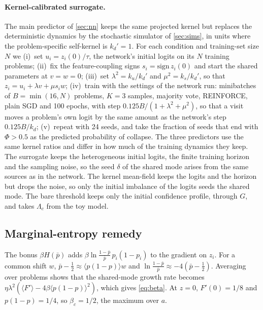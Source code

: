 \paragraph{Kernel-calibrated surrogate.}
The main predictor of \cref{sec:nn} keeps the same projected kernel but replaces the deterministic dynamics by the stochastic simulator of \cref{sec:sims}, in units where the problem-specific self-kernel is $k_d'=1$.
For each condition and training-set size $N$ we
(i)~set $u_i=z_i(0)/\tau$, the network's initial logits on its $N$ training problems;
(ii)~fix the feature-coupling signs $s_i=\mathrm{sign}\,z_i(0)$ and start the shared parameters at $v=w=0$;
(iii)~set $\lambda^2=k_u/k_d'$ and $\mu^2=k_s/k_d'$, so that $z_i=u_i+\lambda v+\mu s_iw$;
(iv)~train with the settings of the network run: minibatches of $B=\min(16,N)$ problems, $K=3$ samples, majority vote, REINFORCE, plain SGD and 100 epochs, with step $0.125B/(1+\lambda^2+\mu^2)$, so that a visit moves a problem's own logit by the same amount as the network's step $0.125B/k_d$;
(v)~repeat with 24 seeds, and take the fraction of seeds that end with $\Phi>0.5$ as the predicted probability of collapse.
The three predictors use the same kernel ratios and differ in how much of the training dynamics they keep. The surrogate keeps the heterogeneous initial logits, the finite training horizon and the sampling noise, so the seed $\delta$ of the shared mode arises from the same sources as in the network. The kernel mean-field keeps the logits and the horizon but drops the noise, so only the initial imbalance of the logits seeds the shared mode. The bare threshold keeps only the initial confidence profile, through $G$, and takes $\Lambda_c$ from the toy model.

\subsection{Marginal-entropy remedy}
\label{app:remedy}
The bonus $\beta H(\bar p)$ adds $\beta\ln\frac{1-\bar p}{\bar p}\,p_i(1-p_i)$ to the gradient on $z_i$.
For a common shift $w$, $\bar p-\tfrac12\approx\langle p(1-p)\rangle w$ and $\ln\frac{1-\bar p}{\bar p}\approx-4(\bar p-\tfrac12)$.
Averaging over problems shows that the shared-mode growth rate becomes $\eta\lambda^2(\langle F'\rangle-4\beta\langle p(1-p)\rangle^2)$, which gives \cref{eq:beta}.
At $z=0$, $F'(0)=1/8$ and $p(1-p)=1/4$, so $\beta_c=1/2$, the maximum over $a$.
